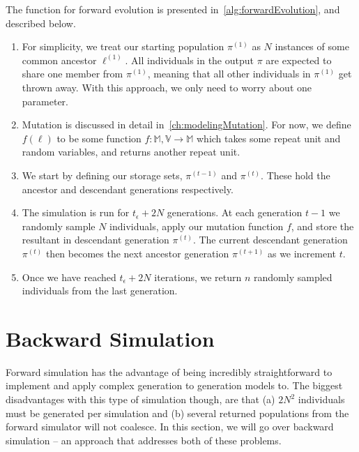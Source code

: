 The function for forward evolution is presented in~\autoref{alg:forwardEvolution}, and described below.
\begin{enumerate}
    \item For simplicity, we treat our starting population $\pi^{(1)}$ as $N$ instances of some common ancestor
        $\ell^{(1)}$.
        All individuals in the output $\pi$ are expected to share one member from $\pi^{(1)}$, meaning that all other
        individuals in $\pi^{(1)}$ get thrown away.
        With this approach, we only need to worry about one parameter.
    \item Mutation is discussed in detail in~\autoref{ch:modelingMutation}.
        For now, we define $f(\ell)$ to be some function $f : \mathbb{M}, \mathbb{V} \rightarrow \mathbb{M}$ which
        takes some repeat unit and random variables, and returns another repeat unit.
    \item We start by defining our storage sets, $\pi^{(t-1)}$ and $\pi^{(t)}$.
        These hold the ancestor and descendant generations respectively.
    \item The simulation is run for $t_\epsilon + 2N$ generations.
        At each generation $t - 1$ we randomly sample $N$ individuals, apply our mutation function $f$, and store the
        resultant in descendant generation $\pi^{(t)}$.
        The current descendant generation $\pi^{(t)}$ then becomes the next ancestor generation
        $\pi^{(t+1)}$ as we increment $t$.
    \item Once we have reached $t_\epsilon + 2N$ iterations, we return $n$ randomly sampled individuals from the last
        generation.
\end{enumerate}


\section{Backward Simulation}\label{sec:backwardSimulation}
Forward simulation has the advantage of being incredibly straightforward to implement and apply complex generation to
generation models to.
The biggest disadvantages with this type of simulation though, are that (a) $2N^2$ individuals must
be generated per simulation and (b) several returned populations from the forward simulator will not coalesce.
In this section, we will go over backward simulation -- an approach that addresses both of these problems.

